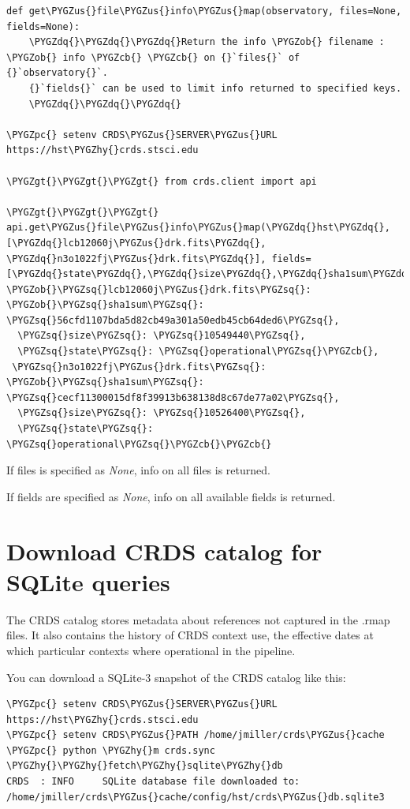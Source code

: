 \documentclass[letterpaper,10pt,english]{sphinxmanual}
\def\PYGZus{\char`\_}
\def\PYGZob{\char`\{}
\def\PYGZcb{\char`\}}
\def\PYGZgt{\char`\>}
\def\PYGZpc{\char`\%}
\def\PYGZhy{\char`\-}
\def\PYGZsq{\char`\'}
\def\PYGZdq{\char`\"}
\begin{document}
\begin{Verbatim}[commandchars=\\\{\}]
def get\PYGZus{}file\PYGZus{}info\PYGZus{}map(observatory, files=None, fields=None):
    \PYGZdq{}\PYGZdq{}\PYGZdq{}Return the info \PYGZob{} filename : \PYGZob{} info \PYGZcb{} \PYGZcb{} on {}`files{}` of {}`observatory{}`.
    {}`fields{}` can be used to limit info returned to specified keys.
    \PYGZdq{}\PYGZdq{}\PYGZdq{}

\PYGZpc{} setenv CRDS\PYGZus{}SERVER\PYGZus{}URL https://hst\PYGZhy{}crds.stsci.edu

\PYGZgt{}\PYGZgt{}\PYGZgt{} from crds.client import api

\PYGZgt{}\PYGZgt{}\PYGZgt{} api.get\PYGZus{}file\PYGZus{}info\PYGZus{}map(\PYGZdq{}hst\PYGZdq{}, [\PYGZdq{}lcb12060j\PYGZus{}drk.fits\PYGZdq{}, \PYGZdq{}n3o1022fj\PYGZus{}drk.fits\PYGZdq{}], fields=[\PYGZdq{}state\PYGZdq{},\PYGZdq{}size\PYGZdq{},\PYGZdq{}sha1sum\PYGZdq{}])
\PYGZob{}\PYGZsq{}lcb12060j\PYGZus{}drk.fits\PYGZsq{}: \PYGZob{}\PYGZsq{}sha1sum\PYGZsq{}: \PYGZsq{}56cfd1107bda5d82cb49a301a50edb45cb64ded6\PYGZsq{},
  \PYGZsq{}size\PYGZsq{}: \PYGZsq{}10549440\PYGZsq{},
  \PYGZsq{}state\PYGZsq{}: \PYGZsq{}operational\PYGZsq{}\PYGZcb{},
 \PYGZsq{}n3o1022fj\PYGZus{}drk.fits\PYGZsq{}: \PYGZob{}\PYGZsq{}sha1sum\PYGZsq{}: \PYGZsq{}cecf11300015df8f39913b638138d8c67de77a02\PYGZsq{},
  \PYGZsq{}size\PYGZsq{}: \PYGZsq{}10526400\PYGZsq{},
  \PYGZsq{}state\PYGZsq{}: \PYGZsq{}operational\PYGZsq{}\PYGZcb{}\PYGZcb{}
\end{Verbatim}

If files is specified as \emph{None},  info on all files is returned.

If fields are specified as \emph{None},  info on all available fields is returned.


\section{Download CRDS catalog for SQLite queries}
\label{database:download-crds-catalog-for-sqlite-queries}
The CRDS catalog stores metadata about references not captured in the .rmap files.   It also contains
the history of CRDS context use,  the effective dates at which particular contexts where operational in
the pipeline.

You can download a SQLite-3 snapshot of the CRDS catalog like this:

\begin{Verbatim}[commandchars=\\\{\}]
\PYGZpc{} setenv CRDS\PYGZus{}SERVER\PYGZus{}URL https://hst\PYGZhy{}crds.stsci.edu
\PYGZpc{} setenv CRDS\PYGZus{}PATH /home/jmiller/crds\PYGZus{}cache
\PYGZpc{} python \PYGZhy{}m crds.sync \PYGZhy{}\PYGZhy{}fetch\PYGZhy{}sqlite\PYGZhy{}db
CRDS  : INFO     SQLite database file downloaded to: /home/jmiller/crds\PYGZus{}cache/config/hst/crds\PYGZus{}db.sqlite3
\end{Verbatim}
\end{document}
